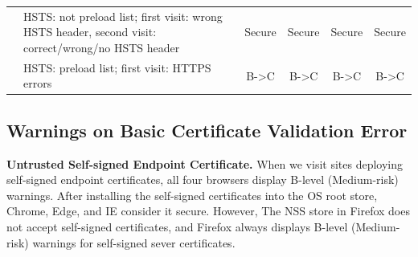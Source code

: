\begin{table}[htbp]
\begin{tabular}{p{2.5cm}|p{8cm}|cccc}
                                                                                                    & HSTS: not preload list; first visit: wrong HSTS header, second visit: correct/wrong/no HSTS header    & Secure               & Secure               & Secure               & Secure               \\
                                                                                                    & HSTS: preload list; first visit: HTTPS errors                                                       & B-\textgreater{}C    & B-\textgreater{}C    & B-\textgreater{}C    & B-\textgreater{}C    \\ \hline
\end{tabular}
  \vspace{6pt}



\end{table}%



\subsection{Warnings on Basic Certificate Validation Error}

\textbf{Untrusted Self-signed Endpoint Certificate.}
    When we visit sites deploying self-signed endpoint certificates, all four browsers display B-level (Medium-risk) warnings.
    After installing the self-signed certificates into the OS root store, Chrome, Edge, and IE consider it secure.
    However, The NSS store in Firefox does not accept self-signed certificates, and Firefox always displays B-level (Medium-risk) warnings for self-signed sever certificates.

